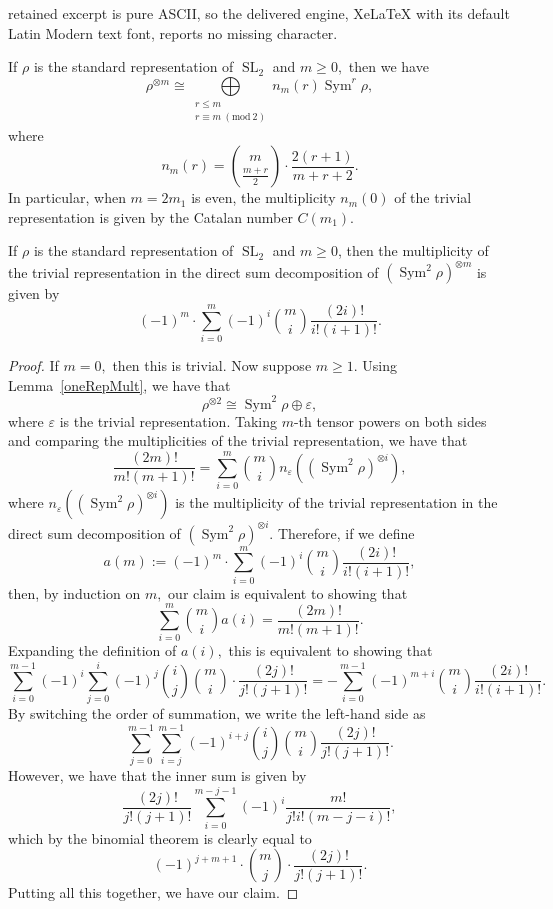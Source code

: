 \documentclass[10pt,a4paper]{amsart}
\DeclareMathOperator{\SL}{SL}
\DeclareMathOperator{\Sym}{Sym}
\newcommand{\Mod}[1]{\ (\mathrm{mod}\ #1)}
\begin{document}
retained excerpt is pure ASCII, so the delivered engine, XeLaTeX with its default Latin Modern text font, reports no missing character.
\begin{lemma}\label{oneRepMult}
    If $\rho$ is the standard representation of $\SL_2$ and $m\geq 0,$ then we have
    $$
    \rho^{\otimes m}\cong\bigoplus\limits_{\substack{r\leq m \\ r\equiv m\Mod{2}}} n_m(r)\Sym^r\rho, 
    $$
    where
    $$
    n_m(r) = \binom{m}{\frac{m+r}{2}}\cdot\frac{2(r+1)}{m+r+2}.
    $$
    In particular, when $m=2m_1$ is even, the multiplicity $n_m(0)$ of the trivial representation is given by the Catalan number $C(m_1).$
\end{lemma}

\begin{lemma}\label{symsquareRepMult}
    If $\rho$ is the standard representation of $\SL_2$ and $m\geq 0$, then the multiplicity of the trivial representation in the direct sum decomposition of $(\Sym^2\rho)^{\otimes m}$ is given by
    $$
    (-1)^m\cdot\sum\limits_{i=0}^m(-1)^i\binom{m}{i}\frac{(2i)!}{i!(i+1)!}.
    $$
\end{lemma}

\begin{proof}
If $m=0,$ then this is trivial. Now suppose $m\geq1.$
Using Lemma~\ref{oneRepMult}, we have that
$$
\rho^{\otimes 2}\cong \Sym^2\rho\oplus\varepsilon,
$$
where $\varepsilon$ is the trivial representation. Taking $m$-th tensor powers on both sides and comparing the multiplicities of the trivial representation, we have that
$$
\frac{(2m)!}{m!(m+1)!} = \sum\limits_{i=0}^m \binom{m}{i}n_\varepsilon((\Sym^2\rho)^{\otimes i}),
$$
where $n_\varepsilon((\Sym^2\rho)^{\otimes i})$ is the multiplicity of the trivial representation in the direct sum decomposition of $(\Sym^2\rho)^{\otimes i}.$ Therefore, if we define
$$
a(m):=(-1)^m\cdot\sum\limits_{i=0}^m(-1)^i\binom{m}{i}\frac{(2i)!}{i!(i+1)!},
$$
then, by induction on $m,$ our claim is equivalent to showing that
$$
\sum\limits_{i=0}^{m}\binom{m}{i}a(i) = \frac{(2m)!}{m!(m+1)!}.
$$
Expanding the definition of $a(i),$ this is equivalent to showing that
$$
\sum\limits_{i=0}^{m-1}(-1)^i\sum\limits_{j=0}^i(-1)^j\binom{i}{j}\binom{m}{i}\cdot\frac
{(2j)!}{j!(j+1)!} = -\sum\limits_{i=0}^{m-1}(-1)^{m+i}\binom{m}{i}\frac{(2i)!}{i!(i+1)!}.
$$
By switching the order of summation, we write the left-hand side as
$$
\sum\limits_{j=0}^{m-1}\sum\limits_{i=j}^{m-1}(-1)^{i+j}\binom{i}{j}\binom{m}{i}\frac{(2j)!}{j!(j+1)!}.
$$
However, we have that the inner sum is given by
$$
\frac{(2j)!}{j!(j+1)!}\sum\limits_{i=0}^{m-j-1}(-1)^i\frac{m!}{j!i!(m-j-i)!},
$$
which by the binomial theorem is clearly equal to
$$
(-1)^{j+m+1}\cdot\binom{m}{j}\cdot\frac{(2j)!}{j!(j+1)!}.
$$
Putting all this together, we have our claim.
\end{proof}
\end{document}
